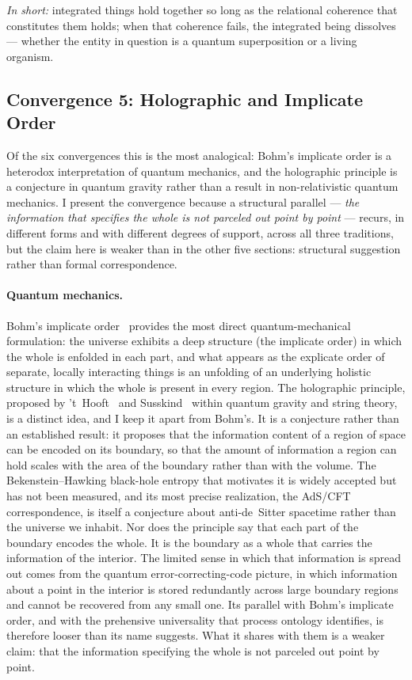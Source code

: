 \emph{In short:} integrated things hold together so long as the
relational coherence that constitutes them holds; when that coherence
fails, the integrated being dissolves --- whether the entity in question
is a quantum superposition or a living organism.

\subsection{Convergence 5: Holographic and Implicate Order}

Of the six convergences this is the most analogical: Bohm's implicate
order is a heterodox interpretation of quantum mechanics, and the
holographic principle is a conjecture in quantum gravity rather than a
result in non-relativistic quantum mechanics.
I present the convergence because a structural parallel ---
\emph{the information that specifies the whole is not parceled out point
by point} --- recurs, in different forms and with different degrees of
support, across all three traditions, but the claim here is
weaker than in the other five sections: structural suggestion rather
than formal correspondence.

\paragraph{Quantum mechanics.}
Bohm's implicate order~\citep{Bohm1980} provides the most direct
quantum-mechanical formulation: the universe exhibits a deep structure (the
implicate order) in which the whole is enfolded in each part, and what
appears as the explicate order of separate, locally interacting things is an
unfolding of an underlying holistic structure in which the whole is present
in every region.
The holographic principle, proposed by 't~Hooft~\citeyearpar{tHooft1993}
and Susskind~\citeyearpar{Susskind1995} within quantum gravity and string theory,
is a distinct idea, and I keep it apart from Bohm's.
It is a conjecture rather than an established result: it proposes that the
information content of a region of space can be encoded on its boundary, so
that the amount of information a region can hold scales with the area of the
boundary rather than with the volume.
The Bekenstein--Hawking black-hole entropy that motivates it is widely accepted
but has not been measured, and its most precise realization, the AdS/CFT
correspondence, is itself a conjecture about anti-de~Sitter spacetime rather
than the universe we inhabit.
Nor does the principle say that each part of the boundary encodes the whole.
It is the boundary as a whole that carries the information of the interior.
The limited sense in which that information is spread out comes from the
quantum error-correcting-code picture, in which information about a point in
the interior is stored redundantly across large boundary regions and cannot be
recovered from any small one.
Its parallel with Bohm's implicate order, and with the prehensive universality
that process ontology identifies, is therefore looser than its name suggests.
What it shares with them is a weaker claim: that the information specifying
the whole is not parceled out point by point.

